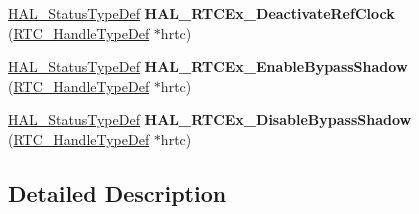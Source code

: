 \begin{DoxyCompactItemize}
\item 
\hyperlink{stm32f4xx__hal__def_8h_a63c0679d1cb8b8c684fbb0632743478f}{H\+A\+L\+\_\+\+Status\+Type\+Def} {\bfseries H\+A\+L\+\_\+\+R\+T\+C\+Ex\+\_\+\+Deactivate\+Ref\+Clock} (\hyperlink{struct_r_t_c___handle_type_def}{R\+T\+C\+\_\+\+Handle\+Type\+Def} $\ast$hrtc)\hypertarget{group___r_t_c_ex___exported___functions___group3_ga86ca6b8e7b4ea0fede8e1aceef36fdbe}{}\label{group___r_t_c_ex___exported___functions___group3_ga86ca6b8e7b4ea0fede8e1aceef36fdbe}

\item 
\hyperlink{stm32f4xx__hal__def_8h_a63c0679d1cb8b8c684fbb0632743478f}{H\+A\+L\+\_\+\+Status\+Type\+Def} {\bfseries H\+A\+L\+\_\+\+R\+T\+C\+Ex\+\_\+\+Enable\+Bypass\+Shadow} (\hyperlink{struct_r_t_c___handle_type_def}{R\+T\+C\+\_\+\+Handle\+Type\+Def} $\ast$hrtc)\hypertarget{group___r_t_c_ex___exported___functions___group3_ga77d4058fefb7d89481ca1af3b87a8a32}{}\label{group___r_t_c_ex___exported___functions___group3_ga77d4058fefb7d89481ca1af3b87a8a32}

\item 
\hyperlink{stm32f4xx__hal__def_8h_a63c0679d1cb8b8c684fbb0632743478f}{H\+A\+L\+\_\+\+Status\+Type\+Def} {\bfseries H\+A\+L\+\_\+\+R\+T\+C\+Ex\+\_\+\+Disable\+Bypass\+Shadow} (\hyperlink{struct_r_t_c___handle_type_def}{R\+T\+C\+\_\+\+Handle\+Type\+Def} $\ast$hrtc)\hypertarget{group___r_t_c_ex___exported___functions___group3_gaabaf6726dca239445ea362554e0f8ce2}{}\label{group___r_t_c_ex___exported___functions___group3_gaabaf6726dca239445ea362554e0f8ce2}

\end{DoxyCompactItemize}


\subsection{Detailed Description}
